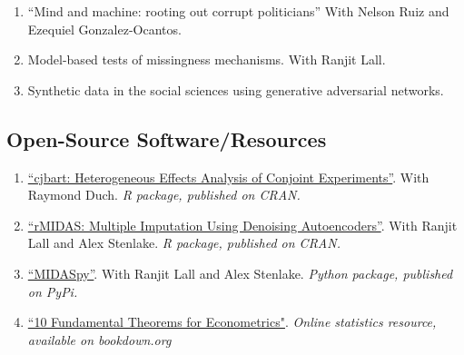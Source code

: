 \documentclass[11pt, a4paper]{article}
\begin{document}
\begin{enumerate}

\item ``Mind and machine: rooting out corrupt politicians'' With Nelson Ruiz and Ezequiel Gonzalez-Ocantos. 

\item Model-based tests of missingness mechanisms. With Ranjit Lall.

\item Synthetic data in the social sciences using generative adversarial networks.


\end{enumerate}


\subsection*{Open-Source Software/Resources}

\begin{enumerate}

  \item \href{https://CRAN.R-project.org/package=cjbart}{``cjbart: Heterogeneous Effects Analysis of Conjoint Experiments''}. With Raymond Duch. \textit{R package, published on CRAN.}

  \item \href{https://CRAN.R-project.org/package=rMIDAS}{``rMIDAS: Multiple Imputation Using Denoising Autoencoders''}. With Ranjit Lall and Alex Stenlake. \textit{R package, published on CRAN.}

  \item \href{https://pypi.org/project/MIDASpy/}{``MIDASpy''}. With Ranjit Lall and Alex Stenlake. \textit{Python package, published on PyPi.}

  \item \href{https://bookdown.org/ts_robinson1994/10EconometricTheorems/}{``10 Fundamental Theorems for Econometrics"}. \textit{Online statistics resource, available on bookdown.org}

\end{enumerate}
\end{document}
